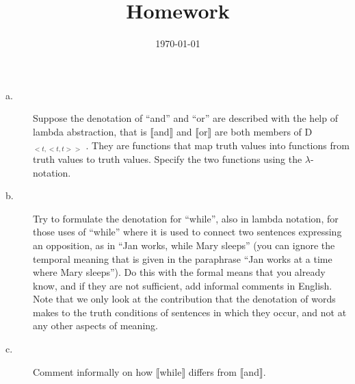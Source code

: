 \documentclass[11pt]{article}
\title{Homework \hwnumber} %
\author{\myname} %
\date{\textbf{\mycourse} \hfill {\today} \hfill \textbf{\semesteryear}} %
\begin{document}
\thispagestyle{empty} %

\clearpage %
\maketitle


\begin{problem}{1}
\begin{description}
    \item[a.] Suppose the denotation of ``and'' and ``or'' are described with the help of lambda abstraction, that is $\llbracket$and$\rrbracket$ and $\llbracket$or$\rrbracket$ are both members of D$_{<t,<t,t>>}$ . They are functions that map truth values into functions from truth values to truth values. Specify the two functions using the $\lambda$-notation.

    \item[b.] Try to formulate the denotation for ``while'', also in lambda notation, for those uses of ``while'' where it is used to connect two sentences expressing an opposition, as in ``Jan works, while Mary sleeps'' (you can ignore the temporal meaning that is given in the paraphrase ``Jan works at a time where Mary sleeps''). Do this with the formal means that you already know, and if they are not sufficient, add informal comments in English. Note that we only look at the contribution that the denotation of words makes to the truth conditions of sentences in which they occur, and not at any other aspects of meaning.

    \item[c.] Comment informally on how $\llbracket$while$\rrbracket$ differs from $\llbracket$and$\rrbracket$.
\end{description}
\end{problem}
\end{document}
